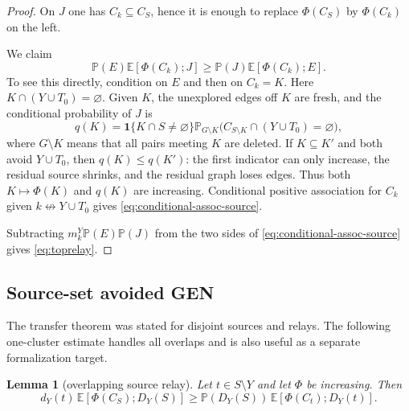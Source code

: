 \documentclass[11pt]{article}
\newtheorem{lemma}[theorem]{Lemma}
\theoremstyle{definition}
\theoremstyle{remark}
\newcommand{\PP}{\mathbb P}
\newcommand{\EE}{\mathbb E}
\newcommand{\one}{\mathbf 1}
\newcommand{\ncon}{\not\leftrightarrow}
\begin{document}
\begin{proof}
On $J$ one has $C_k\subseteq C_S$, hence it is enough to replace
$\Phi(C_S)$ by $\Phi(C_k)$ on the left.

We claim
\begin{equation}\label{eq:conditional-assoc-source}
 \PP(E)\EE[\Phi(C_k);J]
 \geq \PP(J)\EE[\Phi(C_k);E].
\end{equation}
To see this directly, condition on $E$ and then on $C_k=K$.  Here
$K\cap(Y\cup T_0)=\varnothing$.  Given $K$, the unexplored edges off $K$
are fresh, and the conditional probability of $J$ is
\[
 q(K)=\one\{K\cap S\ne\varnothing\}
 \PP_{G\setminus K}\bigl(C_{S\setminus K}\cap(Y\cup T_0)=\varnothing\bigr),
\]
where $G\setminus K$ means that all pairs meeting $K$ are deleted.  If
$K\subseteq K'$ and both avoid $Y\cup T_0$, then $q(K)\leq q(K')$:
the first indicator can only increase, the residual source shrinks, and
the residual graph loses edges.  Thus both $K\mapsto\Phi(K)$ and $q(K)$
are increasing.  Conditional positive association for $C_k$ given
$k\ncon Y\cup T_0$ gives \eqref{eq:conditional-assoc-source}.

Subtracting $m_k^Y\PP(E)\PP(J)$ from the two sides of
\eqref{eq:conditional-assoc-source} gives \eqref{eq:toprelay}.
\end{proof}

\subsection{Source-set avoided GEN}

The transfer theorem was stated for disjoint sources and relays.  The
following one-cluster estimate handles all overlaps and is also useful as
a separate formalization target.

\begin{lemma}[overlapping source relay]\label{lem:source-overlap}
Let $t\in S\setminus Y$ and let $\Phi$ be increasing.  Then
\begin{equation}\label{eq:source-overlap}
 d_Y(t)\,\EE[\Phi(C_S);D_Y(S)]
 \geq
 \PP(D_Y(S))\,\EE[\Phi(C_t);D_Y(t)].
\end{equation}
\end{lemma}
\end{document}
